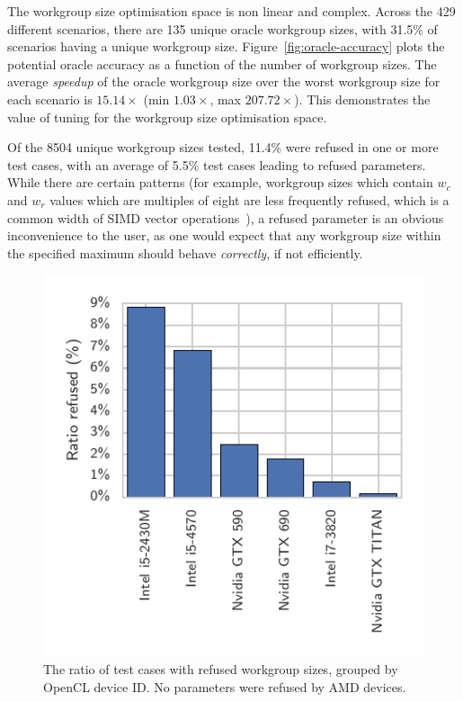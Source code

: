 \documentclass[nonatbib,preprint,10pt]{sigplanconf}
\begin{document}
The workgroup size optimisation space is non linear and
complex. Across the 429 different scenarios, there are 135 unique
oracle workgroup sizes, with 31.5\% of scenarios having a unique
workgroup size. Figure~\ref{fig:oracle-accuracy} plots the potential
oracle accuracy as a function of the number of workgroup sizes. The
average \emph{speedup} of the oracle workgroup size over the worst
workgroup size for each scenario is $15.14\times$ (min $1.03\times$,
max $207.72\times$). This demonstrates the value of tuning for the
workgroup size optimisation space.


Of the 8504 unique workgroup sizes tested, 11.4\% were refused in one
or more test cases, with an average of 5.5\% test cases leading to
refused parameters. While there are certain patterns (for example,
workgroup sizes which contain $w_c$ and $w_r$ values which are
multiples of eight are less frequently refused, which is a common
width of SIMD vector operations~\cite{IntelCorporation2012}), a
refused parameter is an obvious inconvenience to the user, as one
would expect that any workgroup size within the specified maximum
should behave \emph{correctly}, if not efficiently.

\begin{figure}
  \centering
  \centering
  \includegraphics[width=.75\columnwidth]{img/refused_params_by_device}
  \caption[Refused workgroup sizes by device and vendor]{%
    The ratio of test cases with refused workgroup sizes, grouped by
    OpenCL device ID. %
    No parameters were refused by AMD devices.%
  }
\label{fig:refused-params}
\end{figure}
\end{document}
